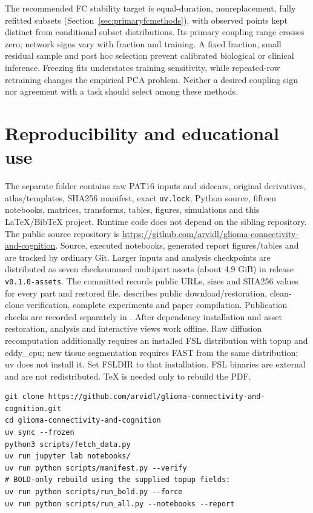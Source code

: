 \documentclass[11pt,a4paper]{article}
\begin{document}
The recommended FC stability target is equal-duration, nonreplacement, fully refitted subsets (Section~\ref{sec:primaryfcmethods}), with observed points kept distinct from conditional subset distributions. Its primary coupling range crosses zero; network signs vary with fraction and training. A fixed fraction, small residual sample and post hoc selection prevent calibrated biological or clinical inference. Freezing fits understates training sensitivity, while repeated-row retraining changes the empirical PCA problem. Neither a desired coupling sign nor agreement with a task should select among these methods.

\section{Reproducibility and educational use}
The separate folder contains raw PAT16 inputs and sidecars, original derivatives, atlas/templates, SHA256 manifest, exact \texttt{uv.lock}, Python source, fifteen notebooks, matrices, transforms, tables, figures, simulations and this LaTeX/BibTeX project. Runtime code does not depend on the sibling repository. The public source repository is \url{https://github.com/arvidl/glioma-connectivity-and-cognition}. Source, executed notebooks, generated report figures/tables and  are tracked by ordinary Git. Larger inputs and analysis checkpoints are distributed as seven checksummed multipart assets (about 4.9 GiB) in release \texttt{v0.1.0-assets}. The committed  records public URLs, sizes and SHA256 values for every part and restored file.  describes public download/restoration, clean-clone verification, complete experiments and paper compilation. Publication checks are recorded separately in . After dependency installation and asset restoration, analysis and interactive views work offline. Raw diffusion recomputation additionally requires an installed FSL distribution with topup and eddy\_cpu; new tissue segmentation requires FAST from the same distribution; uv does not install it. Set FSLDIR to that installation. FSL binaries are external and are not redistributed. TeX is needed only to rebuild the PDF.
\par\medskip\noindent
\begin{minipage}{\linewidth}\small
\begin{verbatim}
git clone https://github.com/arvidl/glioma-connectivity-and-cognition.git
cd glioma-connectivity-and-cognition
uv sync --frozen
python3 scripts/fetch_data.py
uv run jupyter lab notebooks/
uv run python scripts/manifest.py --verify
# BOLD-only rebuild using the supplied topup fields:
uv run python scripts/run_bold.py --force
uv run python scripts/run_all.py --notebooks --report
\end{verbatim}
\end{minipage}\par\medskip
\end{document}
